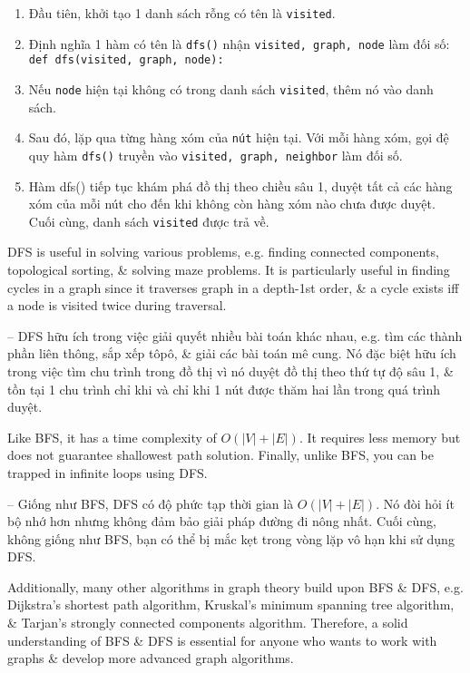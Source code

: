 \documentclass{article}
\begin{document}
\begin{itemize}
\begin{itemize}
\begin{itemize}
\begin{enumerate}
                \item Đầu tiên, khởi tạo 1 danh sách rỗng có tên là {\tt visited}.
                \item Định nghĩa 1 hàm có tên là {\tt dfs()} nhận {\tt visited, graph, node} làm đối số: {\tt def dfs(visited, graph, node):}
                \item Nếu {\tt node} hiện tại không có trong danh sách {\tt visited}, thêm nó vào danh sách.
                \item Sau đó, lặp qua từng hàng xóm của {\tt nút} hiện tại. Với mỗi hàng xóm, gọi đệ quy hàm {\tt dfs()} truyền vào {\tt visited, graph, neighbor} làm đối số.
                \item Hàm {\sf dfs()} tiếp tục khám phá đồ thị theo chiều sâu 1, duyệt tất cả các hàng xóm của mỗi nút cho đến khi không còn hàng xóm nào chưa được duyệt. Cuối cùng, danh sách {\tt visited} được trả về.
            \end{enumerate}
            DFS is useful in solving various problems, e.g. finding connected components, topological sorting, \& solving maze problems. It is particularly useful in finding cycles in a graph since it traverses graph in a depth-1st order, \& a cycle exists iff a node is visited twice during traversal.

            -- DFS hữu ích trong việc giải quyết nhiều bài toán khác nhau, e.g. tìm các thành phần liên thông, sắp xếp tôpô, \& giải các bài toán mê cung. Nó đặc biệt hữu ích trong việc tìm chu trình trong đồ thị vì nó duyệt đồ thị theo thứ tự độ sâu 1, \& tồn tại 1 chu trình chỉ khi và chỉ khi 1 nút được thăm hai lần trong quá trình duyệt.

            Like BFS, it has a time complexity of $O(|V| + |E|)$. It requires less memory but does not guarantee shallowest path solution. Finally, unlike BFS, you can be trapped in infinite loops using DFS.

            -- Giống như BFS, DFS có độ phức tạp thời gian là $O(|V| + |E|)$. Nó đòi hỏi ít bộ nhớ hơn nhưng không đảm bảo giải pháp đường đi nông nhất. Cuối cùng, không giống như BFS, bạn có thể bị mắc kẹt trong vòng lặp vô hạn khi sử dụng DFS.

            Additionally, many other algorithms in graph theory build upon BFS \& DFS, e.g. Dijkstra's shortest path algorithm, Kruskal's minimum spanning tree algorithm, \& Tarjan's strongly connected components algorithm. Therefore, a solid understanding of BFS \& DFS is essential for anyone who wants to work with graphs \& develop more advanced graph algorithms.


\end{itemize}
\end{itemize}
\end{itemize}
\end{document}
